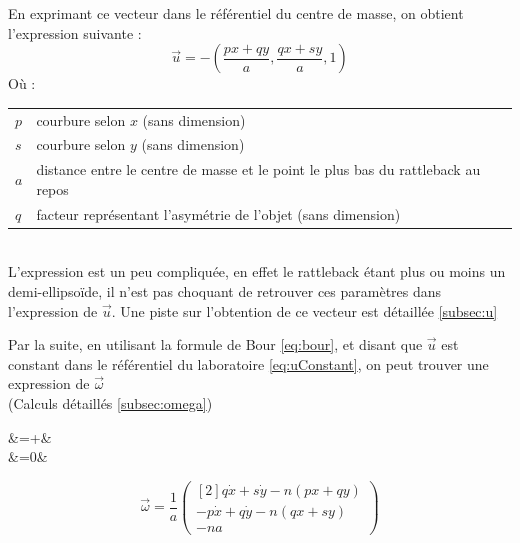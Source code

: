 \documentclass[12pt,a4paper]{article}
\begin{document}
	En exprimant ce vecteur dans le référentiel du centre de masse, on obtient l'expression suivante :
	\begin{equation}
	\vec{u}=-\left(\dfrac{px+qy}{a},\dfrac{qx+sy}{a},1\right)
	\label{eq:uNormal}
	\end{equation}
	Où : \\
	\begin{tabular}{ll}
		$p$ &courbure selon $x$ (sans dimension)\\
		$s$ &courbure selon $y$ (sans dimension)\\
		$a$ &distance entre le centre de masse et le point le plus bas du rattleback au repos\\
		$q$ &facteur représentant l'asymétrie de l'objet (sans dimension)
	\end{tabular}
	\\
	
	L'expression est un peu compliquée, en effet le rattleback étant plus ou moins un demi-ellipsoïde, il n'est pas choquant de retrouver ces paramètres dans l'expression de $\vec{u}$. Une piste sur l'obtention de ce vecteur est détaillée \autoref{subsec:u}
	
	Par la suite, en utilisant la formule de Bour \eqref{eq:bour}, et disant que $\vec{u}$ est constant dans le référentiel du laboratoire \eqref{eq:uConstant}, on peut trouver une expression de $\vec{\omega}$\\(Calculs détaillés \autoref{subsec:omega})
	\pagebreak
	\begin{multicols}{2}
		\setlength\columnseprule{0.5pt}
		\noindent
		\begin{flalign}
		&=+\vec{\omega}\times{}&
		\label{eq:bour}\\[1em]
		&=0&
		\label{eq:uConstant}
		\end{flalign}
		\vfill\null
		\columnbreak
		\noindent
		\begin{equation}
		\vec{\omega}=\dfrac{1}{a}\begin{pmatrix}[2]
		q\dot{x}+s\dot{y}-n(px+qy)\\
		-p\dot{x}+q\dot{y}-n(qx+sy)\\
		- na
		\end{pmatrix}
		\end{equation}
	\end{multicols}
	
\end{document}
